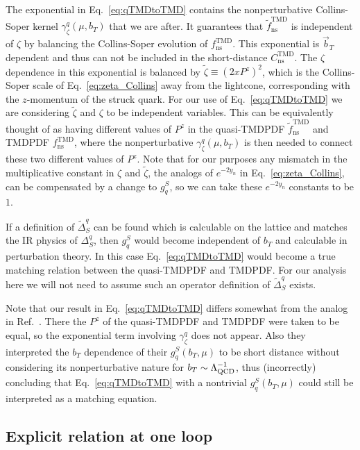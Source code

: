 \documentclass[prd,aps,twocolumn,bibnotes,nofootinbib,preprintnumbers,floatfix]{revtex4-1}
\DeclareRobustCommand{\eq}[1]{Eq.~\eqref{eq:#1}}
\DeclareRobustCommand{\mycite}[1]{Ref.~\cite{#1}}
\newcommand{\LQCD}{\Lambda_{\rm QCD}}
\newcommand{\bt}{\vec b_T}
\newcommand{\ns}{{\text{ns}}}
\newcommand\TMD{\mathrm{TMD}}
\begin{document}
The exponential in \eq{qTMDtoTMD} contains the nonperturbative Collins-Soper kernel $\gamma_\zeta^q(\mu,b_T)$ that we are after.
It guarantees that $\tilde f_\ns^\TMD$ is independent of $\zeta$ by balancing the Collins-Soper evolution of $f^\TMD_\ns$.
This exponential is $\bt$ dependent and thus can not be included in the short-distance  $C_\ns^\TMD$.
The $\zeta$ dependence in this exponential is balanced by $\tilde\zeta \equiv (2 x P^z)^2$, which is the Collins-Soper scale of \eq{zeta_Collins} away from the lightcone, corresponding with the $z$-momentum of the struck quark. For our use of \eq{qTMDtoTMD} we are considering $\tilde\zeta$ and $\zeta$ to be independent variables. This can be equivalently thought of as having different values of $P^z$ in the quasi-TMDPDF $\tilde f_\ns^\TMD$ and TMDPDF $f_\ns^\TMD$, where the nonperturbative $\gamma_\zeta^q(\mu,b_T)$ is then needed to connect these two different values of $P^z$.  Note that for our purposes any mismatch in the multiplicative constant in $\zeta$ and $\tilde \zeta$, the analogs of $e^{-2y_n}$ in \eq{zeta_Collins}, can be compensated by a change to $g_q^S$, so we can take these $e^{-2y_n}$ constants to be $1$.  

If a definition of $\tilde\Delta_S^q$ can be found which is calculable on the lattice and matches the IR physics of $\Delta_S^q$, then $g^S_q$ would become independent of $b_T$ and calculable in perturbation theory. In this case \eq{qTMDtoTMD} would become a true matching relation between the quasi-TMDPDF and TMDPDF. For our analysis here we will not need to assume   such an operator definition of $\tilde\Delta_S^q$ exists.

Note that our result in \eq{qTMDtoTMD} differs somewhat from the analog in \mycite{Ji:2018hvs}. There the $P^z$ of the quasi-TMDPDF and TMDPDF were taken to be equal, so the exponential term involving $\gamma_\zeta^q$ does not appear. Also they interpreted the $b_T$ dependence of their $g_q^S(b_T,\mu)$ to be short distance without considering its nonperturbative nature for $b_T\sim \LQCD^{-1}$, thus (incorrectly) concluding that \eq{qTMDtoTMD} with a nontrivial $g_q^S(b_T,\mu)$ could still be interpreted as a matching equation.


\subsection{Explicit relation at one loop}
\end{document}
